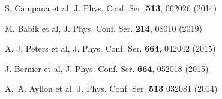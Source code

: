 \begin{thebibliography}{}
%
%


S. Campana et al, J. Phys. Conf. Ser. {\bf513}, 062026 (2014)



M. Babik et al, J. Phys. Conf. Ser. {\bf214}, 08010 (2019)

 A. J. Peters et al, J. Phys. Conf. Ser. {\bf664}, 042042 (2015)




J. Bernier et al, J. Phys. Conf. Ser. {\bf664}, 052018 (2015)





A.~A. Ayllon et al, 
J. Phys. Conf. Ser. {\bf 513} 032081 (2014)










\end{thebibliography}
